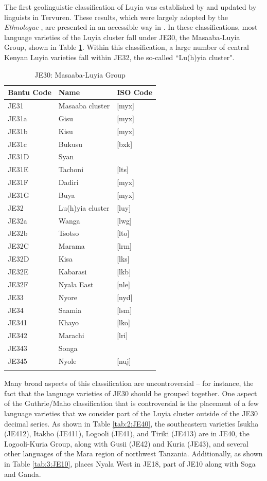 \documentclass[output=paper]{langscibook}
\begin{document}
The first geolinguistic classification of Luyia was established by  \citet{guthrie_classification_1948,guthrie_comparative_1967} and updated by linguists in Tervuren. These results, which were largely adopted by the \textit{Ethnologue} \citep{lewis_ethnologue:_2016}, are presented in an accessible way in \citet{maho_nugl_2009}. In these classifications, most language varieties of the Luyia cluster fall under JE30, the Masaaba-Luyia Group, shown in Table \ref{tab:1:JE30}. Within this classification, a large number of central Kenyan Luyia varieties fall within JE32, the so-called ``Lu(h)yia cluster".

\begin{table}
\caption{JE30: Masaaba-Luyia Group \citep{maho_nugl_2009}}
\label{tab:1:JE30}
 \begin{tabular}{lll} 
  \lsptoprule
  Bantu Code & Name & ISO Code \\ 
  \midrule
  JE31  &   Masaaba cluster &    [myx]\\
  JE31a  &   Gisu &   [myx]\\
  JE31b  &  Kisu  &  [myx]\\
  JE31c  & Bukusu  & [bxk] \\
  JE31D  & Syan  &  \\
  JE31E  & Tachoni  & [lts] \\
  JE31F  & Dadiri  & [myx] \\
  JE31G  & Buya  & [myx] \\
  JE32  & Lu(h)yia cluster  & [luy] \\
  JE32a  & Wanga  & [lwg] \\
  JE32b  & Tsotso  & [lto] \\
  JE32C  & Marama  & [lrm] \\
  JE32D  & Kisa  & [lks] \\
  JE32E  & Kabarasi  & [lkb] \\
  JE32F  & Nyala East & [nle] \\
  JE33  & Nyore  & [nyd] \\
  JE34  & Saamia  & [lsm] \\
  JE341  & Khayo  & [lko] \\
  JE342  & Marachi  & [lri] \\
  JE343  & Songa  &  \\
  JE345  & Nyole  & [nuj] \\
  \lspbottomrule
 \end{tabular}
\end{table}

Many broad aspects of this classification are uncontroversial -- for instance, the fact that the language varieties of JE30 should be grouped together. One aspect of the Guthrie/Maho classification that is controversial is the placement of a few language varieties that we consider part of the Luyia cluster outside of the JE30 decimal series. As shown in Table \ref{tab:2:JE40}, the southeastern varieties Isukha (JE412), Itakho (JE411), Logooli (JE41), and Tiriki (JE413) are in JE40, the Logooli-Kuria Group, along with Gusii (JE42) and Kuria (JE43), and several other languages of the Mara region of northwest Tanzania. Additionally, as shown in Table \ref{tab:3:JE10}, \citet{maho_nugl_2009} places Nyala West in JE18, part of JE10 along with Soga and Ganda.
\end{document}
